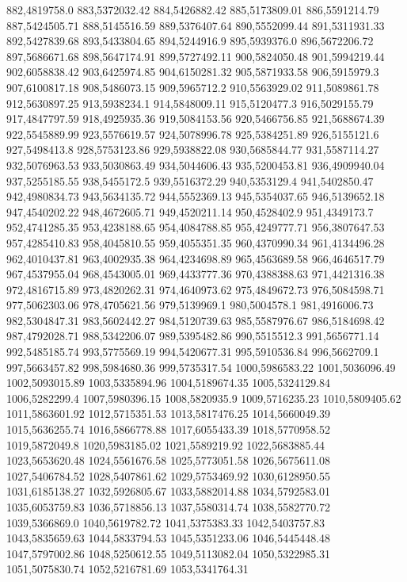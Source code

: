 882,4819758.0
883,5372032.42
884,5426882.42
885,5173809.01
886,5591214.79
887,5424505.71
888,5145516.59
889,5376407.64
890,5552099.44
891,5311931.33
892,5427839.68
893,5433804.65
894,5244916.9
895,5939376.0
896,5672206.72
897,5686671.68
898,5647174.91
899,5727492.11
900,5824050.48
901,5994219.44
902,6058838.42
903,6425974.85
904,6150281.32
905,5871933.58
906,5915979.3
907,6100817.18
908,5486073.15
909,5965712.2
910,5563929.02
911,5089861.78
912,5630897.25
913,5938234.1
914,5848009.11
915,5120477.3
916,5029155.79
917,4847797.59
918,4925935.36
919,5084153.56
920,5466756.85
921,5688674.39
922,5545889.99
923,5576619.57
924,5078996.78
925,5384251.89
926,5155121.6
927,5498413.8
928,5753123.86
929,5938822.08
930,5685844.77
931,5587114.27
932,5076963.53
933,5030863.49
934,5044606.43
935,5200453.81
936,4909940.04
937,5255185.55
938,5455172.5
939,5516372.29
940,5353129.4
941,5402850.47
942,4980834.73
943,5634135.72
944,5552369.13
945,5354037.65
946,5139652.18
947,4540202.22
948,4672605.71
949,4520211.14
950,4528402.9
951,4349173.7
952,4741285.35
953,4238188.65
954,4084788.85
955,4249777.71
956,3807647.53
957,4285410.83
958,4045810.55
959,4055351.35
960,4370990.34
961,4134496.28
962,4010437.81
963,4002935.38
964,4234698.89
965,4563689.58
966,4646517.79
967,4537955.04
968,4543005.01
969,4433777.36
970,4388388.63
971,4421316.38
972,4816715.89
973,4820262.31
974,4640973.62
975,4849672.73
976,5084598.71
977,5062303.06
978,4705621.56
979,5139969.1
980,5004578.1
981,4916006.73
982,5304847.31
983,5602442.27
984,5120739.63
985,5587976.67
986,5184698.42
987,4792028.71
988,5342206.07
989,5395482.86
990,5515512.3
991,5656771.14
992,5485185.74
993,5775569.19
994,5420677.31
995,5910536.84
996,5662709.1
997,5663457.82
998,5984680.36
999,5735317.54
1000,5986583.22
1001,5036096.49
1002,5093015.89
1003,5335894.96
1004,5189674.35
1005,5324129.84
1006,5282299.4
1007,5980396.15
1008,5820935.9
1009,5716235.23
1010,5809405.62
1011,5863601.92
1012,5715351.53
1013,5817476.25
1014,5660049.39
1015,5636255.74
1016,5866778.88
1017,6055433.39
1018,5770958.52
1019,5872049.8
1020,5983185.02
1021,5589219.92
1022,5683885.44
1023,5653620.48
1024,5561676.58
1025,5773051.58
1026,5675611.08
1027,5406784.52
1028,5407861.62
1029,5753469.92
1030,6128950.55
1031,6185138.27
1032,5926805.67
1033,5882014.88
1034,5792583.01
1035,6053759.83
1036,5718856.13
1037,5580314.74
1038,5582770.72
1039,5366869.0
1040,5619782.72
1041,5375383.33
1042,5403757.83
1043,5835659.63
1044,5833794.53
1045,5351233.06
1046,5445448.48
1047,5797002.86
1048,5250612.55
1049,5113082.04
1050,5322985.31
1051,5075830.74
1052,5216781.69
1053,5341764.31
